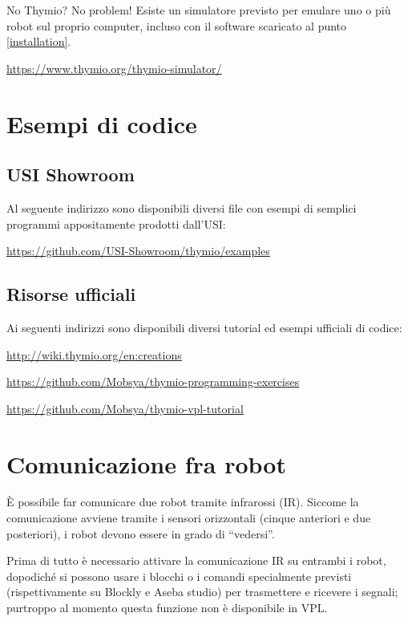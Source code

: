 \documentclass[12pt]{article}
\begin{document}
		No Thymio? No problem! Esiste un simulatore previsto per emulare uno o più robot sul proprio computer, incluso con il software scaricato al punto \ref{installation}.
		
	
		\url{https://www.thymio.org/thymio-simulator/}
		
		
\section{Esempi di codice}

	\subsection{USI Showroom}
		
		Al seguente indirizzo sono disponibili diversi file con esempi di semplici programmi appositamente prodotti dall'USI:
		
		\url{https://github.com/USI-Showroom/thymio/examples}
		
		
		
		
	
	\subsection{Risorse ufficiali}
	
		Ai seguenti indirizzi sono disponibili diversi tutorial ed esempi ufficiali di codice:
	
		\url{http://wiki.thymio.org/en:creations}
		
		\url{https://github.com/Mobsya/thymio-programming-exercises}
		
		\url{https://github.com/Mobsya/thymio-vpl-tutorial}
	
	
\section{Comunicazione fra robot}\label{network}

	È possibile far comunicare due robot tramite infrarossi (IR). Siccome la comunicazione avviene tramite i sensori orizzontali (cinque anteriori e due posteriori), i robot devono essere in grado di ``vedersi''.
	
	Prima di tutto è necessario attivare la comunicazione IR su entrambi i robot, dopodiché si possono usare i blocchi o i comandi specialmente previsti (rispettivamente su Blockly e Aseba studio) per trasmettere e ricevere i segnali; purtroppo al momento questa funzione non è disponibile in VPL. 
	
\end{document}
